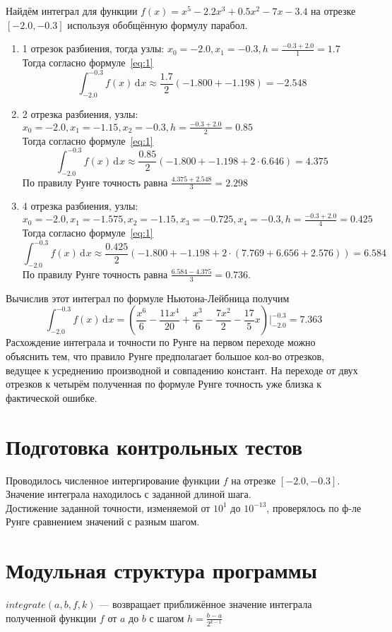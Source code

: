 \documentclass[a4paper]{article}
\newcommand{\dd}[1][]{\ensuremath{\,\mathrm{d}^{#1}}}
\begin{document}
Найдём интеграл для функции \(f(x) = x^{5} -2.2x^3 + 0.5x^2 -7x -3.4\) на отрезке \([-2.0, -0.3]\) используя обобщённую
формулу парабол.
\begin{enumerate}
  \item 1 отрезок разбиения, тогда узлы: \(x_{0} = -2.0, x_{1} = -0.3, h = \frac{-0.3 + 2.0}{1} = 1.7\)\\
        Тогда согласно формуле~\eqref{eq:1} \[
        \int_{-2.0}^{-0.3}f(x)\dd x \approx \frac{1.7}{2} (-1.800 + -1.198) = -2.548
        \]
  \item 2 отрезка разбиения, узлы: \(x_0 = -2.0, x_1 = -1.15, x_2 = -0.3, h = \frac{-0.3+2.0}{2} = 0.85\)\\
        Тогда согласно формуле~\eqref{eq:1} \[
        \int_{-2.0}^{-0.3} f(x)\dd x \approx \frac{0.85}{2}(-1.800 + -1.198 + 2 \cdot 6.646) = 4.375
        \]
        По правилу Рунге точность равна \(\frac{4.375 + 2.548}{3} = 2.298\)
  \item 4 отрезка разбиения, узлы:
        \(x_0 = -2.0, x_1 = -1.575, x_2 = -1.15, x_3 = -0.725, x_4 = -0.3, h = \frac{-0.3+2.0}{4} = 0.425\)\\
        Тогда согласно формуле~\eqref{eq:1} \[
        \int_{-2.0}^{-0.3} f(x)\dd x \approx \frac{0.425}{2}(-1.800 + -1.198 + 2 \cdot (7.769 + 6.656 + 2.576)) = 6.584
        \]
        По правилу Рунге точность равна \(\frac{6.584 - 4.375}{3} = 0.736\).
\end{enumerate}
Вычислив этот интеграл по формуле Ньютона-Лейбница получим \[
  \int_{-2.0}^{-0.3} f(x)\dd x = \left( \frac{x^{6}}{6} - \frac{11x^{4}}{20} + \frac{x^3}{6} - \frac{7x^{2}}{2} - \frac{17}{5} x \right)\bigg|_{-2.0}^{-0.3} = 7.363
\]
Расхождение интеграла и точности по Рунге на первом переходе можно объяснить тем, что правило Рунге предполагает большое
кол-во отрезков, ведущее к усреднению производной и совпадению констант. На переходе от двух отрезков к четырём
полученная по формуле Рунге точность уже близка к фактической ошибке.
\section{Подготовка контрольных тестов}\label{sec:S6}
Проводилось численное интергирование функции \(f\) на отрезке \([-2.0,-0.3]\). Значение интеграла находилось с заданной длиной шага.\\
Достижение заданной точности, изменяемой от \(10^{1}\) до \(10^{-13}\), проверялось по ф-ле Рунге сравнением значений с разным шагом.
\section{Модульная структура программы}\label{sec:S7}
\(integrate(a,b,f,k)\) --- возвращает приближённое значение интеграла полученной функции \(f\) от \(a\) до \(b\) с шагом \(h=\frac{b-a}{2^{k-1}}\)
\end{document}
